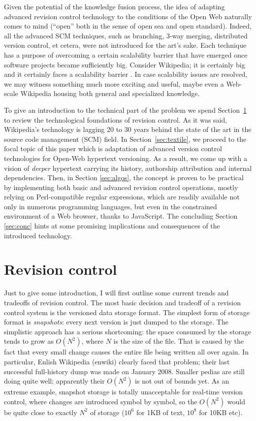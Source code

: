 \documentclass{acm_proc_article-sp}
\begin{document}
Given the potential of the knowledge fusion process, the idea
of adapting advanced revision control technology to the conditions
of the Open Web naturally comes to mind (``open'' both in the
sense of open sea and open standard). 
Indeed, all the advanced SCM techniques, such as branching,
3-way merging, distributed version control, et cetera, were not
introduced for the art's sake. Each technique has a purpose of
overcoming a certain scalability barrier that have emerged once
software projects became sufficiently big. 
Consider Wikipedia; it is certainly big and it certainly faces
a scalability barrier \cite{wp-elites, wp-decay}. In case
scalability issues are resolved, we
may witness something much more exciting and useful, maybe even 
a Web-scale Wikipedia housing both general and specialized
knowledge.

To give an introduction to the technical part of the problem we spend
Section~\ref{sec:scm} to
review the technological foundations of
revision control. As it was said, Wikipedia's technology 
is lagging 20 to 30 years behind the state of the art in the
source code management (SCM) field. 
In Section~\ref{sec:textile}, we proceed to the focal topic of
this paper which is
adaptation of advanced version control technologies for Open-Web
hypertext versioning. As a result, we come up with a vision of
\emph{deeper} hypertext carrying its history, authorship
attribution and internal dependencies.
Then, in Section \ref{sec:algos}, the concept is proven to be
practical by implementing both
basic and advanced revision control operations, mostly relying
on Perl-compatible regular expressions, which are readily available not
only in numerous programming languages, but even in the
constrained environment of a Web browser, thanks to JavaScript.
The concluding Section \ref{sec:conc} hints at some promising
implications and consequences of the introduced technology.




\section{Revision control} \label{sec:scm}

Just to give some introduction, I will first outline some current
trends and tradeoffs of revision control. The most
basic decision and tradeoff of a revision control system
is the versioned data
storage format. The simplest form of storage format is \emph{snapshots}:
every next version is just dumped to the storage. The simplistic
approach has a serious shortcoming: the space consumed by the storage
tends to grow as $O(N^2)$, where $N$ is the size of the file.
That is caused by the fact that every small change causes the
entire file being written all over again. In particular, Enlish
Wikipedia (enwiki) clearly faced that problem; their last successful
full-history dump was made on January 2008. Smaller pedias are
still doing quite well; apparently their $O(N^2)$ is not
out of bounds yet.
As an extreme example, snapshot storage is totally
unacceptable for real-time version control, where changes
are introduced symbol by symbol, so the $O(N^2)$ would be quite
close to exactly $N^2$ of storage ($10^{6}$ for 1KB of text,
$10^{8}$ for 10KB etc).
\end{document}
